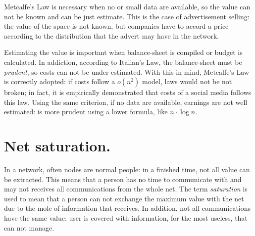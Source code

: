 \documentclass[12pt, a4page]{article}
\begin{document}
Metcalfe's Law is necessary when no or small data are available, so the value can not be known and can be just estimate.
This is the case of advertisement selling: the value of the space is not known, but companies have to accord a price according to the distribution that the advert may have in the network. \newline
 
Estimating the value is important when balance-sheet is compiled or budget is calculated. In addiction, according to Italian's Law, the balance-sheet must be \textit{prudent}, so costs can not be under-estimated.
With this in mind, Metcalfe's Law is correctly adopted: if costs follow a $o(n^2)$ model, laws would not be not broken; in fact, it is empirically demonstrated that costs of a social media follows this law.
Using the same criterion, if no data are available, earnings are not well estimated: is more prudent using a lower formula, like $n \cdot \log{n}$. \newline

\section{Net saturation.}
In a network, often nodes are normal people: in a finished time, not all value can be extracted.
This means that a person has no time to communicate with and may not receives all communications from the whole net.
The term \textit{saturation} is used to mean that a person can not exchange the maximum value with the net due to the mole of information that receives.
In addition, not all communications have the same value: user is covered with information, for the most useless, that can not manage.


\end{document}
